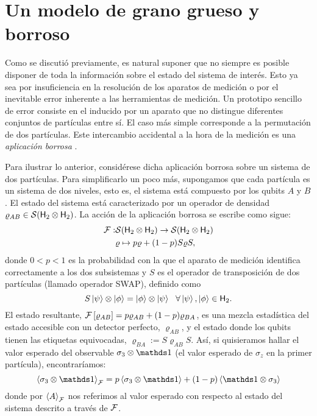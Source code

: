 \section{Un modelo de grano grueso y borroso}\label{sec:CH2CG}

Como se discutió previamente, es natural suponer que no siempre es posible disponer de toda la información sobre el estado\acnote{\checkmark} del sistema de interés. Esto ya sea por insuficiencia en la resolución de los aparatos de medición o por el inevitable error inherente a las herramientas de medición. Un prototipo sencillo de error consiste en el inducido por un aparato que no distingue diferentes conjuntos de partículas entre sí. El caso más simple corresponde a la permutación de dos partículas. Este intercambio accidental a la hora de la medición es una \textit{aplicación borrosa} \cite{FuzzyMeasurements}.

Para ilustrar lo anterior, considérese dicha aplicación borrosa sobre un sistema de dos partículas. Para simplificarlo un poco más, supongamos que cada partícula es un sistema de dos niveles, esto es, el sistema está compuesto por los qubits $A$ y $B$. El estado del sistema está caracterizado por un operador de densidad $\varrho_{AB} \in \mathcal{S}({\sf H}_2 \otimes {\sf H}_2)$. La acción de la aplicación borrosa se escribe como sigue:
\begin{align}
\mathcal{F}:&\mathcal{S}({\sf H}_2 \otimes {\sf H}_2)\to \mathcal{S}({\sf H}_2 \otimes {\sf H}_2)\nonumber\\
&\varrho \mapsto p\varrho+(1-p)S\varrho S,\nonumber
\end{align}
donde $0<p<1$ es la probabilidad con la que el aparato de medición identifica correctamente \acnote{\checkmark} a los dos subsistemas y $S$ es el operador de transposición de dos partículas (llamado operador SWAP), definido como 
\begin{equation}
    S\ket{\psi}\otimes \ket{\phi}=\ket{\phi}\otimes \ket{\psi} \ \ \forall \ket{\psi},\ket{\phi}\in {\sf H}_2.\nonumber
\end{equation}
El estado resultante, $\mathcal{F}\left[\varrho_{AB}\right]=p\varrho_{AB}+(1-p)\varrho_{BA}$, es una mezcla estadística del estado accesible con un detector perfecto, $\varrho_{AB}$, y el estado donde los qubits tienen las etiquetas equivocadas, $\varrho_{BA}:=S\varrho_{AB} S$. Así, si quisieramos hallar el valor esperado del observable $\sigma_{3}\otimes\Id$ (el valor esperado de $\sigma_{z}$ en la primer partícula), encontraríamos:
\begin{equation}
    \expval{\sigma_{3}\otimes\Id}_{\mcF}=p\expval{\sigma_{3}\otimes\Id}+(1-p)\expval{\Id\otimes\sigma_{3}}\nonumber
\end{equation}\acnote{\checkmark}
donde por $\expval{A}_{\mathcal{F}}$ nos referimos al valor esperado con respecto al estado del sistema descrito a través de $\mathcal{F}$.

